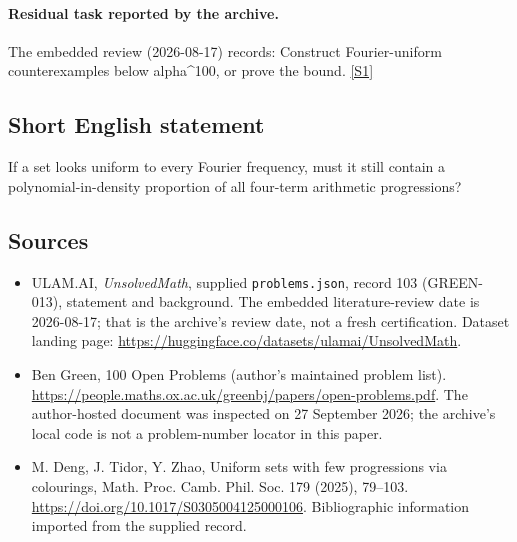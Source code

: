 \documentclass[11pt,a4paper]{article}
\newcommand{\sref}[2]{\hyperlink{source:#1:#2}{[S#2]}}
\begin{document}
\paragraph{Residual task reported by the archive.}

The embedded review (2026-08-17) records: Construct Fourier-uniform counterexamples below alpha\textasciicircum{}100, or prove the bound. \sref{103}{1}

\subsection{Short English statement}

If a set looks uniform to every Fourier frequency, must it still contain a polynomial-in-density proportion of all four-term arithmetic progressions?

\subsection{Sources}

{\small

\begin{itemize}

\item[\hypertarget{source:103:1}{S1}] ULAM.AI, \emph{UnsolvedMath}, supplied \texttt{problems.json}, record 103 (GREEN-013), statement and background. The embedded literature-review date is 2026-08-17; that is the archive’s review date, not a fresh certification. Dataset landing page: \url{https://huggingface.co/datasets/ulamai/UnsolvedMath}.

\item[\hypertarget{source:103:2}{S2}] Ben Green, 100 Open Problems (author’s maintained problem list). \url{https://people.maths.ox.ac.uk/greenbj/papers/open-problems.pdf}. The author-hosted document was inspected on 27 September 2026; the archive’s local code is not a problem-number locator in this paper.

\item[\hypertarget{source:103:3}{S3}] M. Deng, J. Tidor, Y. Zhao, Uniform sets with few progressions via colourings, Math. Proc. Camb. Phil. Soc. 179 (2025), 79--103. \url{https://doi.org/10.1017/S0305004125000106}. Bibliographic information imported from the supplied record.

\end{itemize}

}

\label{end:103}
\end{document}
